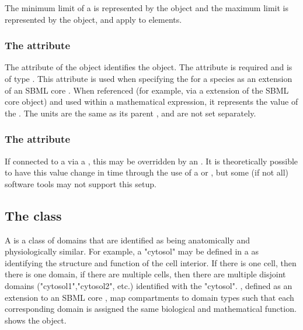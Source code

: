 The minimum limit of a \CoordinateComponent is represented by the  object and the maximum limit is represented by the  object, and apply to \CoordinateComponent elements.


\subsubsection{The  attribute}
The  attribute of the \Boundary object identifies the object. The attribute is required and is of type . This attribute is used when specifying the \BoundaryCondition for a species as an extension of an SBML core \Parameter.   When referenced (for example, via a \SpatialSymbolReference extension of the SBML core \Parameter object) and used within a mathematical expression, it represents the value of the \Boundary.  The units are the same as its parent \CoordinateComponent, and are not set separately.

\subsubsection{The  attribute}


If connected to a \Parameter via a \SpatialSymbolReference, this  may be overridden by an \InitialAssignment.  It is theoretically possible to have this value change in time through the use of a \Rule or \Event, but some (if not all) software tools may not support this setup. 


\subsection{The  class}
\label{DomainType-class}
A \DomainType is a class of domains that are identified as being anatomically and physiologically similar.  For example, a \DomainType "cytosol" may be defined in a \Geometry as identifying the structure and function of the cell interior.  If there is one cell, then there is one domain, if there are multiple cells, then there are multiple disjoint domains ("cytosol1","cytosol2", etc.) identified with the \DomainType "cytosol".  \CompartmentMappings, defined as an extension to an SBML core \Compartment, map compartments to domain types such that each corresponding domain is assigned the same biological and mathematical function.  shows the \DomainType object.

